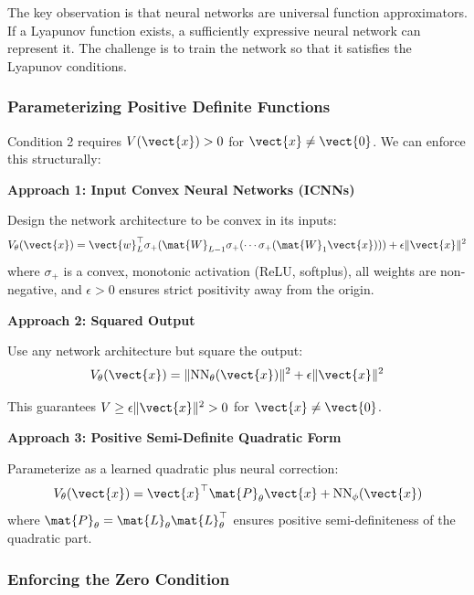 The key observation is that neural networks are universal function approximators. If a Lyapunov function exists, a sufficiently expressive neural network can represent it. The challenge is to train the network so that it satisfies the Lyapunov conditions.

\subsubsection{Parameterizing Positive Definite Functions}

Condition 2 requires $V(\vect{x}) > 0$ for $\vect{x} \neq \vect{0}$. We can enforce this structurally:

\textbf{Approach 1: Input Convex Neural Networks (ICNNs)}

Design the network architecture to be convex in its inputs:
\begin{equation}
V_\theta(\vect{x}) = \vect{w}_L^\top \sigma_+(\mat{W}_{L-1}\sigma_+(\cdots \sigma_+(\mat{W}_1 \vect{x}))) + \epsilon \|\vect{x}\|^2
\label{eq:icnn_lyapunov}
\end{equation}
where $\sigma_+$ is a convex, monotonic activation (ReLU, softplus), all weights are non-negative, and $\epsilon > 0$ ensures strict positivity away from the origin.

\textbf{Approach 2: Squared Output}

Use any network architecture but square the output:
\begin{equation}
V_\theta(\vect{x}) = \|\text{NN}_\theta(\vect{x})\|^2 + \epsilon \|\vect{x}\|^2
\label{eq:squared_lyapunov}
\end{equation}

This guarantees $V \geq \epsilon\|\vect{x}\|^2 > 0$ for $\vect{x} \neq \vect{0}$.

\textbf{Approach 3: Positive Semi-Definite Quadratic Form}

Parameterize as a learned quadratic plus neural correction:
\begin{equation}
V_\theta(\vect{x}) = \vect{x}^\top \mat{P}_\theta \vect{x} + \text{NN}_\phi(\vect{x})
\label{eq:quadratic_plus_nn}
\end{equation}
where $\mat{P}_\theta = \mat{L}_\theta \mat{L}_\theta^\top$ ensures positive semi-definiteness of the quadratic part.

\subsubsection{Enforcing the Zero Condition}

